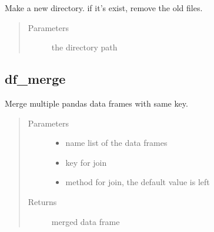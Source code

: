 \documentclass[letterpaper,12pt,english]{sphinxmanual}
\begin{document}
\begin{fulllineitems}
Make a new directory. if it’s exist, remove the old files.
\begin{quote}\begin{description}
\item[{Parameters}] \leavevmode
{} \textendash{} the directory path

\end{description}\end{quote}

\end{fulllineitems}



\subsection{df\_merge}
\label{\detokenize{basics:df-merge}}

\begin{fulllineitems}
Merge multiple pandas data frames with same key.
\begin{quote}\begin{description}
\item[{Parameters}] \leavevmode\begin{itemize}
\item {} 
 \textendash{} name list of the data frames

\item {} 
 \textendash{} key for join

\item {} 
 \textendash{} method for join, the default value is left

\end{itemize}

\item[{Returns}] \leavevmode
merged data frame

\end{description}\end{quote}

\end{fulllineitems}
\end{document}

